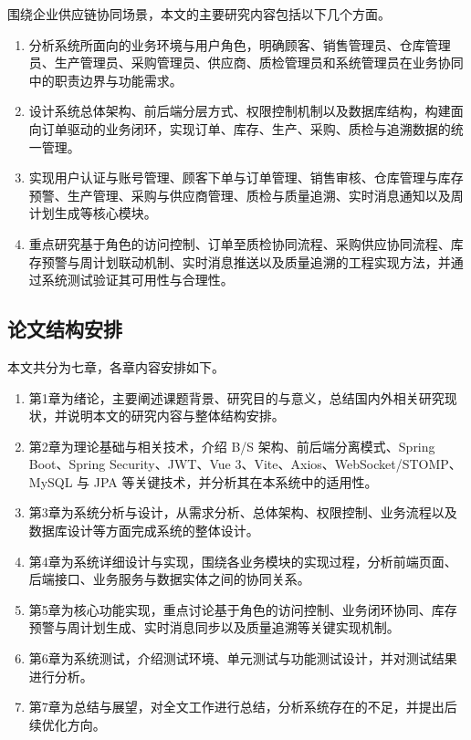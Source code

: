 围绕企业供应链协同场景，本文的主要研究内容包括以下几个方面。
\begin{enumerate}
  \item 分析系统所面向的业务环境与用户角色，明确顾客、销售管理员、仓库管理员、生产管理员、采购管理员、供应商、质检管理员和系统管理员在业务协同中的职责边界与功能需求。
  \item 设计系统总体架构、前后端分层方式、权限控制机制以及数据库结构，构建面向订单驱动的业务闭环，实现订单、库存、生产、采购、质检与追溯数据的统一管理。
  \item 实现用户认证与账号管理、顾客下单与订单管理、销售审核、仓库管理与库存预警、生产管理、采购与供应商管理、质检与质量追溯、实时消息通知以及周计划生成等核心模块。
  \item 重点研究基于角色的访问控制、订单至质检协同流程、采购供应协同流程、库存预警与周计划联动机制、实时消息推送以及质量追溯的工程实现方法，并通过系统测试验证其可用性与合理性。
\end{enumerate}

\subsection{论文结构安排}

本文共分为七章，各章内容安排如下。
\begin{enumerate}
  \item 第1章为绪论，主要阐述课题背景、研究目的与意义，总结国内外相关研究现状，并说明本文的研究内容与整体结构安排。
  \item 第2章为理论基础与相关技术，介绍 B/S 架构、前后端分离模式、Spring Boot、Spring Security、JWT、Vue 3、Vite、Axios、WebSocket/STOMP、MySQL 与 JPA 等关键技术，并分析其在本系统中的适用性。
  \item 第3章为系统分析与设计，从需求分析、总体架构、权限控制、业务流程以及数据库设计等方面完成系统的整体设计。
  \item 第4章为系统详细设计与实现，围绕各业务模块的实现过程，分析前端页面、后端接口、业务服务与数据实体之间的协同关系。
  \item 第5章为核心功能实现，重点讨论基于角色的访问控制、业务闭环协同、库存预警与周计划生成、实时消息同步以及质量追溯等关键实现机制。
  \item 第6章为系统测试，介绍测试环境、单元测试与功能测试设计，并对测试结果进行分析。
  \item 第7章为总结与展望，对全文工作进行总结，分析系统存在的不足，并提出后续优化方向。
\end{enumerate}